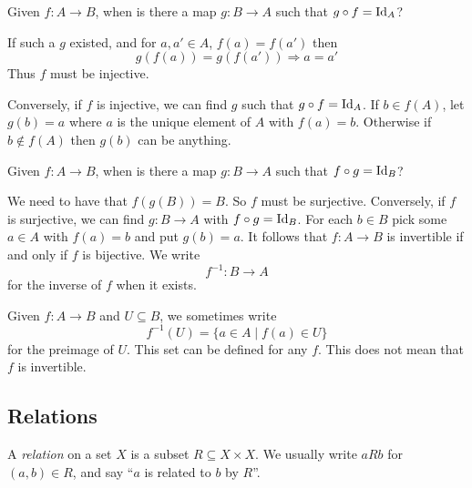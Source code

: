 \documentclass{article}
\begin{document}
\begin{question}
    Given $f: A \rightarrow B$, when is there a map $g: B \rightarrow A$ such that $g \circ f = \mathrm{Id}_A$?
\end{question}
If such a $g$ existed, and for $a, a' \in A$, $f(a) = f(a')$ then
\[
    g(f(a)) = g(f(a')) \Rightarrow a = a'  
\]
Thus $f$ must be injective.
\begin{center}
\end{center}
Conversely, if $f$ is injective, we can find $g$ such that $g \circ f = \mathrm{Id}_A$.
If $b \in f(A)$, let $g(b) = a$ where $a$ is the unique element of $A$ with $f(a) = b$.
Otherwise if $b \notin f(A)$ then $g(b)$ can be anything.

\begin{question}
    Given $f: A \rightarrow B$, when is there a map $g: B \rightarrow A$ such that $f \circ g = \mathrm{Id}_B$?
\end{question}
We need to have that $f(g(B)) = B$.
So $f$ must be surjective. 
Conversely, if $f$ is surjective, we can find $g: B \rightarrow A$ with $f \circ g = \mathrm{Id}_B$.
For each $b \in B$ pick some $a \in A$ with $f(a) = b$ and put $g(b) = a$.
It follows that $f: A \rightarrow B$ is invertible if and only if $f$ is bijective.
We write
\[
    f^{-1}: B \rightarrow A
\]
for the inverse of $f$ when it exists.

\begin{warning}
    Given $f: A \rightarrow B$ and $U \subseteq B$, we sometimes write
    \[
        f^{-1}(U) = \{a \in A \mid f(a) \in U\}
    \]
    for the preimage of $U$.
    This set can be defined for any $f$. 
    This does not mean that $f$ is invertible.
\end{warning}

\subsection{Relations}
A \emph{relation} on a set $X$ is a subset $R \subseteq X \times X$. 
We usually write $aRb$ for $(a, b) \in R$, and say ``$a$ is related to $b$ by $R$''.
\end{document}
